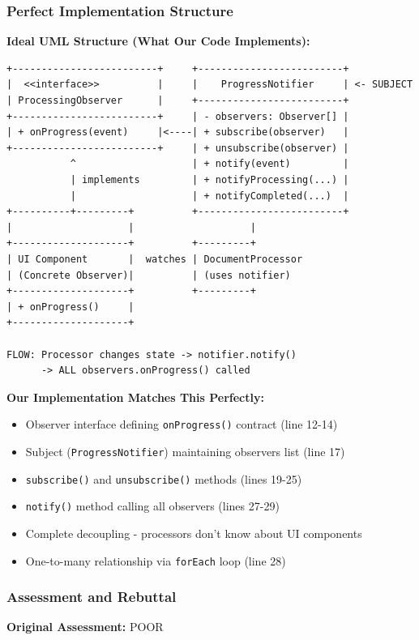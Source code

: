 \documentclass[11pt]{article}
\begin{document}
\subsubsection{Perfect Implementation Structure}

\textbf{Ideal UML Structure (What Our Code Implements):}

\begin{verbatim}
+-------------------------+     +-------------------------+
|  <<interface>>          |     |    ProgressNotifier     | <- SUBJECT
| ProcessingObserver      |     +-------------------------+
+-------------------------+     | - observers: Observer[] |
| + onProgress(event)     |<----| + subscribe(observer)   |
+-------------------------+     | + unsubscribe(observer) |
           ^                    | + notify(event)         |
           | implements         | + notifyProcessing(...) |
           |                    | + notifyCompleted(...)  |
+----------+---------+          +-------------------------+
|                    |                    |
+--------------------+          +---------+
| UI Component       |  watches | DocumentProcessor
| (Concrete Observer)|          | (uses notifier)
+--------------------+          +---------+
| + onProgress()     |
+--------------------+

FLOW: Processor changes state -> notifier.notify()
      -> ALL observers.onProgress() called
\end{verbatim}

\textbf{Our Implementation Matches This Perfectly:}
\begin{itemize}[noitemsep]
    \item [+] Observer interface defining \texttt{onProgress()} contract (line 12-14)
    \item [+] Subject (\texttt{ProgressNotifier}) maintaining observers list (line 17)
    \item [+] \texttt{subscribe()} and \texttt{unsubscribe()} methods (lines 19-25)
    \item [+] \texttt{notify()} method calling all observers (lines 27-29)
    \item [+] Complete decoupling - processors don't know about UI components
    \item [+] One-to-many relationship via \texttt{forEach} loop (line 28)
\end{itemize}

\subsubsection{Assessment and Rebuttal}
\textbf{Original Assessment:} POOR
\end{document}
